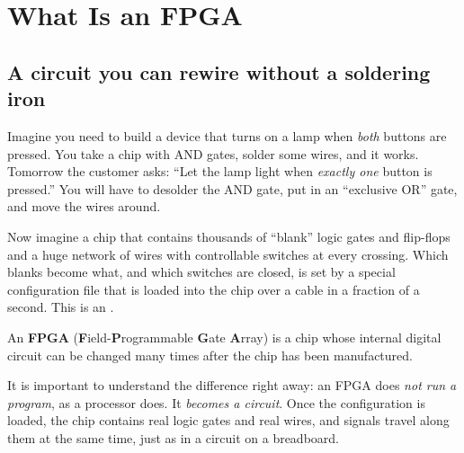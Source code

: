 \chapter{What Is an FPGA}
\label{ch:fpga}

\section{A circuit you can rewire without a soldering iron}

Imagine you need to build a device that turns on a lamp
when \emph{both} buttons are pressed. You take a chip with AND gates,
solder some wires, and it works. Tomorrow the customer asks: ``Let the lamp
light when \emph{exactly one} button is pressed.'' You will have to desolder
the AND gate, put in an ``exclusive OR'' gate, and move the wires around.

Now imagine a chip that contains thousands of
``blank'' logic gates and flip-flops and a huge network of
wires with controllable switches at every crossing. Which
blanks become what, and which switches are closed, is set by a
special configuration file that is loaded into the chip over a cable
in a fraction of a second. This is an .

\begin{ideabox}
An \textbf{FPGA} (\textbf{F}ield-\textbf{P}rogrammable \textbf{G}ate
\textbf{A}rray) is a chip whose internal
digital circuit can be changed many times after the chip has been manufactured.
\end{ideabox}

It is important to understand the difference right away: an FPGA does \emph{not run a program}, as a
processor does. It \emph{becomes a circuit}. Once the configuration is loaded, the
chip contains real logic gates and real wires,
and signals travel along them at the same time, just as in a circuit on a breadboard.

